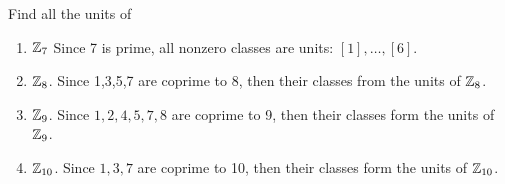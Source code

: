 \documentclass[../hw2]{subfiles}
\begin{document}
\begin{problem}[2]
Find all the units of
\begin{enumerate}[label=\alph*)]
	\item $\mathbb{Z}_7$
	      Since 7 is prime, all nonzero classes are units: $[1],\ldots,[6]$.
	\item $\mathbb{Z}_8$.
	      Since 1,3,5,7 are coprime to 8, then their classes from the units of $\mathbb{Z}_8$.
	\item $\mathbb{Z}_9$.
	      Since $1,2,4,5,7,8$ are coprime to 9, then their classes form the units of  $\mathbb{Z}_9$.
	\item  $\mathbb{Z}_{10}$.
	      Since $1,3,7$ are coprime to 10, then their classes form the units of  $\mathbb{Z}_{10}$.
\end{enumerate}
\end{problem}
\end{document}
